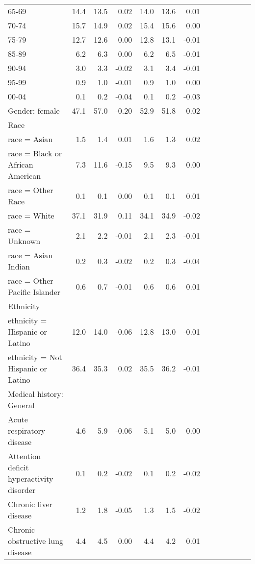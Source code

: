 \documentclass[11pt,]{article}
\begin{document}
\begin{longtable}{lrrrrrrrrrrrr}
      65-69 & 14.4 & 13.5 &  0.02 & 14.0 & 13.6 &  0.01 \\ 
      70-74 & 15.7 & 14.9 &  0.02 & 15.4 & 15.6 &  0.00 \\ 
      75-79 & 12.7 & 12.6 &  0.00 & 12.8 & 13.1 & -0.01 \\ 
      85-89 &  6.2 &  6.3 &  0.00 &  6.2 &  6.5 & -0.01 \\ 
      90-94 &  3.0 &  3.3 & -0.02 &  3.1 &  3.4 & -0.01 \\ 
      95-99 &  0.9 &  1.0 & -0.01 &  0.9 &  1.0 &  0.00 \\ 
      00-04 &  0.1 &  0.2 & -0.04 &  0.1 &  0.2 & -0.03 \\ 
  Gender: female & 47.1 & 57.0 & -0.20 & 52.9 & 51.8 &  0.02 \\ 
  Race &    &    &     &    &    &     \\ 
      race = Asian &  1.5 &  1.4 &  0.01 &  1.6 &  1.3 &  0.02 \\ 
      race = Black or African American &  7.3 & 11.6 & -0.15 &  9.5 &  9.3 &  0.00 \\ 
      race = Other Race &  0.1 &  0.1 &  0.00 &  0.1 &  0.1 &  0.01 \\ 
      race = White & 37.1 & 31.9 &  0.11 & 34.1 & 34.9 & -0.02 \\ 
      race = Unknown &  2.1 &  2.2 & -0.01 &  2.1 &  2.3 & -0.01 \\ 
      race = Asian Indian &  0.2 &  0.3 & -0.02 &  0.2 &  0.3 & -0.04 \\ 
      race = Other Pacific Islander &  0.6 &  0.7 & -0.01 &  0.6 &  0.6 &  0.01 \\ 
  Ethnicity &    &    &     &    &    &     \\ 
      ethnicity = Hispanic or Latino & 12.0 & 14.0 & -0.06 & 12.8 & 13.0 & -0.01 \\ 
      ethnicity = Not Hispanic or Latino & 36.4 & 35.3 &  0.02 & 35.5 & 36.2 & -0.01 \\ 
  Medical history: General &    &    &     &    &    &     \\ 
      Acute respiratory disease &  4.6 &  5.9 & -0.06 &  5.1 &  5.0 &  0.00 \\ 
      Attention deficit hyperactivity disorder &  0.1 &  0.2 & -0.02 &  0.1 &  0.2 & -0.02 \\ 
      Chronic liver disease &  1.2 &  1.8 & -0.05 &  1.3 &  1.5 & -0.02 \\ 
      Chronic obstructive lung disease &  4.4 &  4.5 &  0.00 &  4.4 &  4.2 &  0.01 \\ 

\end{longtable}
\end{document}
